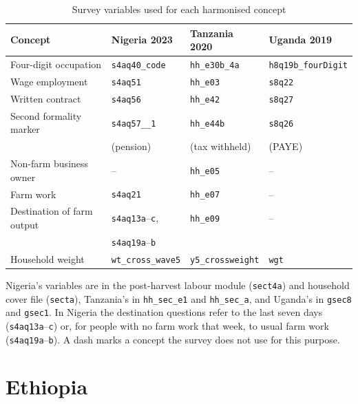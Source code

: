\begin{table}[ht]
\centering
\caption{Survey variables used for each harmonised concept}
\label{tab:vars}
\footnotesize
\begin{tabular}{llll}
\toprule
Concept & Nigeria 2023 & Tanzania 2020 & Uganda 2019 \\
\midrule
Four-digit occupation      & \texttt{s4aq40\_code}   & \texttt{hh\_e30b\_4a}    & \texttt{h8q19b\_fourDigit} \\
Wage employment            & \texttt{s4aq51}         & \texttt{hh\_e03}         & \texttt{s8q22} \\
Written contract           & \texttt{s4aq56}         & \texttt{hh\_e42}         & \texttt{s8q27} \\
Second formality marker    & \texttt{s4aq57\_\_1}    & \texttt{hh\_e44b}        & \texttt{s8q26} \\
                           & (pension)               & (tax withheld)           & (PAYE) \\
Non-farm business owner    & --                      & \texttt{hh\_e05}         & -- \\
Farm work                  & \texttt{s4aq21}         & \texttt{hh\_e07}         & -- \\
Destination of farm output & \texttt{s4aq13a}--\texttt{c}, & \texttt{hh\_e09}   & -- \\
                           & \texttt{s4aq19a}--\texttt{b}  &                    &    \\
Household weight           & \texttt{wt\_cross\_wave5} & \texttt{y5\_crossweight} & \texttt{wgt} \\
\bottomrule
\end{tabular}

\vspace{4pt}
\begin{minipage}{0.9\linewidth}
\footnotesize
Nigeria's variables are in the post-harvest labour module (\texttt{sect4a})
and household cover file (\texttt{secta}), Tanzania's in \texttt{hh\_sec\_e1}
and \texttt{hh\_sec\_a}, and Uganda's in \texttt{gsec8} and \texttt{gsec1}.
In Nigeria the destination questions refer to the last seven days
(\texttt{s4aq13a}--\texttt{c}) or, for people with no farm work that week, to
usual farm work (\texttt{s4aq19a}--\texttt{b}). A dash marks a concept the
survey does not use for this purpose.
\end{minipage}
\end{table}

\section{Ethiopia}
\label{app:ethiopia}

